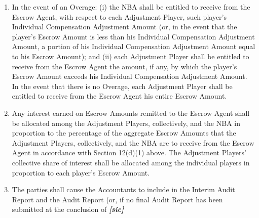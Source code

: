\documentclass[
]{book}
\providecommand{\tightlist}{%
  \setlength{\itemsep}{0pt}\setlength{\parskip}{0pt}}
\begin{document}
\begin{enumerate}
  \begin{enumerate}
  \def\labelenumii{(\arabic{enumii})}
  \tightlist
  \item
    In the event of an Overage: (i) the NBA shall be entitled to receive from the Escrow Agent, with respect to each Adjustment Player, such player's Individual Compensation Adjustment Amount (or, in the event that the player's Escrow Amount is less than his Individual Compensation Adjustment Amount, a portion of his Individual Compensation Adjustment Amount equal to his Escrow Amount); and (ii) each Adjustment Player shall be entitled to receive from the Escrow Agent the amount, if any, by which the player's Escrow Amount exceeds his Individual Compensation Adjustment Amount. In the event that there is no Overage, each Adjustment Player shall be entitled to receive from the Escrow Agent his entire Escrow Amount.
  \item
    Any interest earned on Escrow Amounts remitted to the Escrow Agent shall be allocated among the Adjustment Players, collectively, and the NBA in proportion to the percentage of the aggregate Escrow Amounts that the Adjustment Players, collectively, and the NBA are to receive from the Escrow Agent in accordance with Section 12(d)(1) above. The Adjustment Players' collective share of interest shall be allocated among the individual players in proportion to each player's Escrow Amount.
  \item
    The parties shall cause the Accountants to include in the Interim Audit Report and the Audit Report (or, if no final Audit Report has been submitted at the conclusion of \textbf{\emph{{[}sic{]}}}


\end{enumerate}
\end{enumerate}
\end{document}

